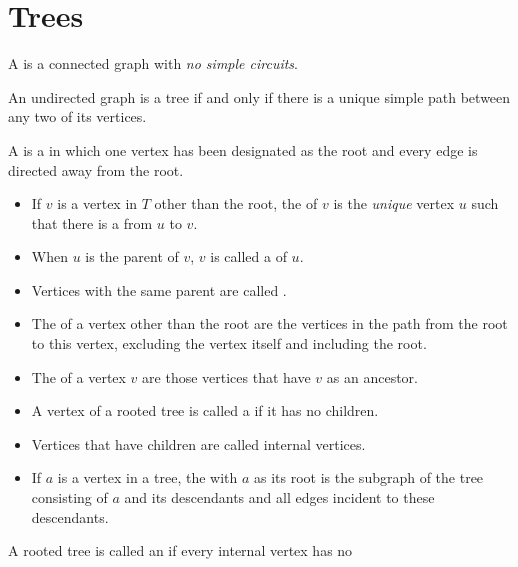 \chapter{Trees}

            \par A  is a connected graph with \textit{no simple circuits}.
            \par An undirected graph is a tree if and only if there is a unique simple path between
            any two of its vertices.
    \hiiEND
            \par A  is a in which one vertex has been designated as the root
            and every edge is directed away from the root.
            \begin{itemize}
                \item If $v$ is a vertex in $T$ other than the root, the  of $v$ is
                    the \textit{unique} vertex $u$ such that there is a  from
                    $u$ to $v$.
                \item When $u$ is the parent of $v$, $v$ is called a  of $u$.
                \item Vertices with the same parent are called .
                \item The  of a vertex other than the root are the vertices
                    in the path from the root to this vertex, excluding the vertex itself and
                    including the root.
                \item The  of a vertex $v$ are those vertices that have $v$ as
                    an ancestor.
                \item A vertex of a rooted tree is called a  if it has no children.
                \item Vertices that have children are called internal vertices.
                \item If $a$ is a vertex in a tree, the  with $a$ as its root is
                    the subgraph of the tree consisting of $a$ and its descendants and all edges
                    incident to these descendants.
            \end{itemize}
            \par A rooted tree is called an  if every internal vertex has no
